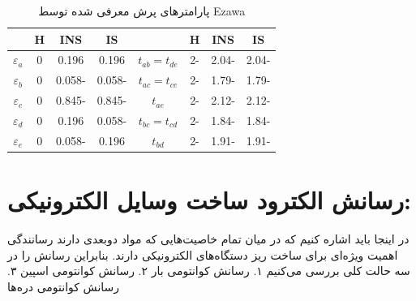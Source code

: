 \begin{table}
  \centering
  \caption{پارامترهای پرش  معرفی شده توسط \gls{Ezawa}\cite{ezawaTripletFermionsDirac2017}\label{tbl:hoppingtable}}
  \begin{tabular}{cccccccc}
  \toprule
   & H & INS & IS &
   & H & INS & IS\\
  \midrule
  $\varepsilon_a$& 0 &  0.196 &  0.196 & $t_{ab}=t_{de}$& 2- & 2.04- & 2.04- \\
  $\varepsilon_b$& 0 & 0.058- & 0.058- & $t_{ac}=t_{ce}$& 2- & 1.79- & 1.79- \\
  $\varepsilon_c$& 0 & 0.845- & 0.845- & $t_{ae}$& 2- & 2.12- & 2.12-   \\
  $\varepsilon_d$& 0 &  0.196 & 0.058- & $t_{bc}=t_{cd}$& 2- & 1.84- & 1.84- \\
  $\varepsilon_e$& 0 & 0.058- &  0.196 & $t_{bd}$& 2- & 1.91- & 1.91-  \\
  \bottomrule
  \end{tabular}
\end{table}
\section{رسانش الکترود ساخت وسایل الکترونیکی:}
در اینجا باید اشاره کنیم که در ‌میان تمام خاصیت‌هایی که مواد دوبعدی دارند رسانندگی اهمیت ویژه‌ای برای ساخت ریز دستگاه‌های الکترونیکی دارند. بنابراین رسانش را در سه حالت کلی بررسی ‌می‌کنیم
۱. رسانش کوانتو‌‌می‌‌ بار
۲. رسانش کوانتو‌‌می‌‌ اسپین
۳. رسانش کوانتو‌‌می‌‌ دره‌ها
